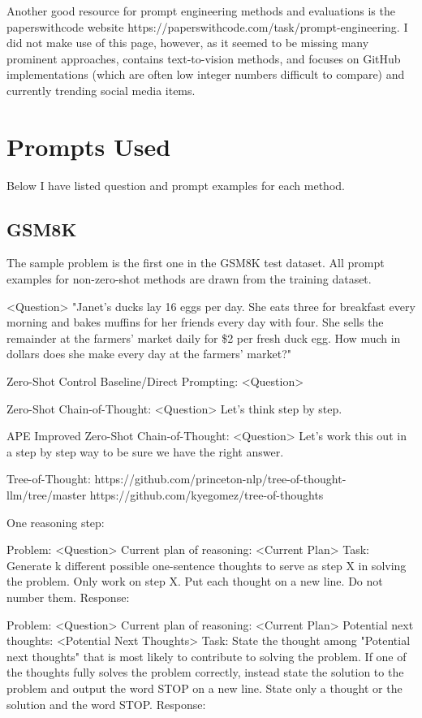 \documentclass[11pt]{article}
\begin{document}
Another good resource for prompt engineering methods and evaluations is the paperswithcode website https://paperswithcode.com/task/prompt-engineering. I did not make use of this page, however, as it seemed to be missing many prominent approaches, contains text-to-vision methods, and focuses on GitHub implementations (which are often low integer numbers difficult to compare) and currently trending social media items.

\section{Prompts Used}

Below I have listed question and prompt examples for each method.
\subsection{GSM8K}

The sample problem is the first one in the GSM8K test dataset. All prompt examples for non-zero-shot methods are drawn from the training dataset.

<Question> "Janet's ducks lay 16 eggs per day. She eats three for breakfast every morning and bakes muffins for her friends every day with four. She sells the remainder at the farmers' market daily for \$2 per fresh duck egg. How much in dollars does she make every day at the farmers' market?"

Zero-Shot Control Baseline/Direct Prompting:
<Question>

Zero-Shot Chain-of-Thought:
<Question>
Let's think step by step.

APE Improved Zero-Shot Chain-of-Thought:
<Question>
Let's work this out in a step by step way to be sure we have the right answer.

Tree-of-Thought: https://github.com/princeton-nlp/tree-of-thought-llm/tree/master https://github.com/kyegomez/tree-of-thoughts

One reasoning step:

Problem:
<Question>
Current plan of reasoning:
<Current Plan>
Task:
Generate {k} different possible one-sentence thoughts to serve as step {X} in solving the problem. Only work on step {X}. Put each thought on a new line. Do not number them.
Response:

Problem:
<Question> 
Current plan of reasoning:
<Current Plan>
Potential next thoughts:
<Potential Next Thoughts>
Task:
State the thought among "Potential next thoughts" that is most likely to contribute to solving the problem. If one of the thoughts fully solves the problem correctly, instead state the solution to the problem and output the word STOP on a new line. State only a thought or the solution and the word STOP.
Response:
\end{document}
